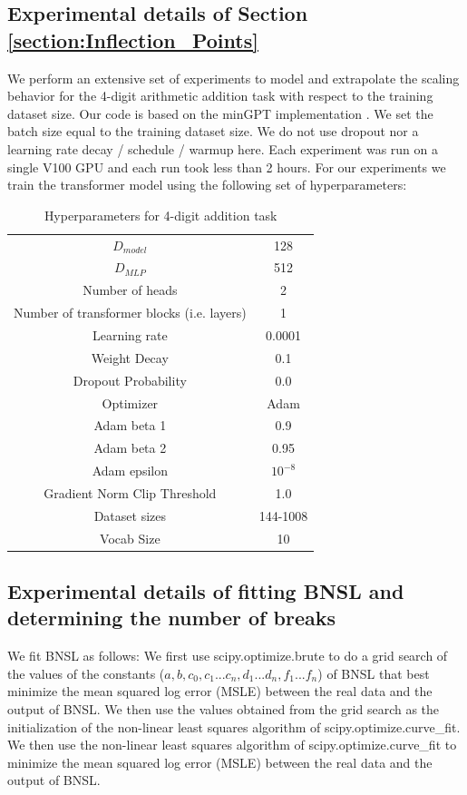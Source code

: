 \documentclass{article} %
\begin{document}
\subsection{Experimental details of Section \ref{section:Inflection_Points}}
\label{section:Inflection_points_experimental}
We perform an extensive set of experiments to model and extrapolate the scaling behavior for the 4-digit arithmetic addition task with respect to the training dataset size. Our code is based on the minGPT implementation \citep{Karpathy2020}. We set the batch size equal to the training dataset size. We do not use dropout nor a learning rate decay / schedule / warmup here. Each experiment was run on a single V100 GPU and each run took less than 2 hours. For our experiments we train the transformer model using the following set of hyperparameters:
\begin{table}[hbt!]
    \centering
    \begin{tabular}{c|c}
         $D_{model}$ & 128 \\
         $D_{MLP}$ & 512 \\
         Number of heads & 2 \\
         Number of transformer blocks (i.e. layers) & 1 \\
         Learning rate & 0.0001\\
         Weight Decay & 0.1\\
         Dropout Probability & 0.0\\
         Optimizer & Adam\\
         Adam beta 1 & 0.9\\
         Adam beta 2 & 0.95 \\
         Adam epsilon & $10^{-8}$\\
         Gradient Norm Clip Threshold & 1.0 \\
         Dataset sizes & 144-1008 \\
         Vocab Size & 10 \\
         
    \end{tabular}
    \caption{Hyperparameters for 4-digit addition task}
    \label{tab:my_label}
\end{table}

\subsection{Experimental details of fitting BNSL and determining the number of breaks}
\label{section:BNSL_fit_details}
We fit BNSL as follows:
We first use scipy.optimize.brute to do a grid search of the values of the constants ($a, b, c_0, c_1 ... c_n, d_1 ...  d_n, f_1 ... f_n$) of BNSL that best minimize the mean squared log error (MSLE) between the real data and the output of BNSL.
We then use the values obtained from the grid search as the initialization of the non-linear least squares algorithm of scipy.optimize.curve\_fit.
We then use the non-linear least squares algorithm of scipy.optimize.curve\_fit to minimize the mean squared log error (MSLE) between the real data and the output of BNSL.
\end{document}
